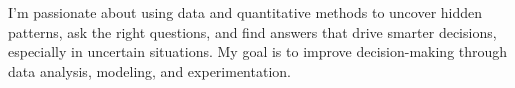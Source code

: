 

\begin{cvparagraph}


I’m passionate about using data and quantitative methods to uncover hidden patterns, ask the right questions, and find answers that drive smarter decisions, especially in uncertain situations. My goal is to improve decision-making through data analysis, modeling, and experimentation.

\end{cvparagraph}
